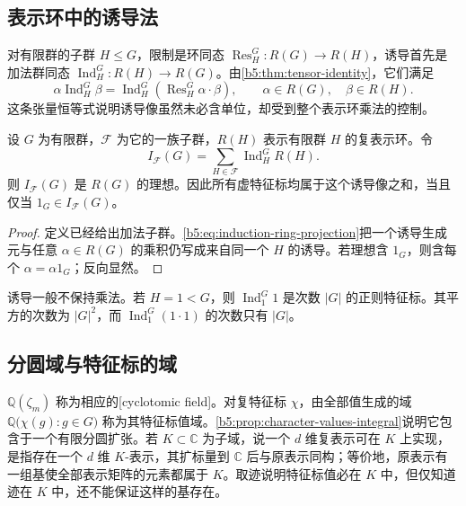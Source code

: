 \subsection{表示环中的诱导法}
\label{b5:subsec:0501:03}

对有限群的子群 \(H\le G\)，限制是环同态 \(\operatorname{Res}_H^G:R(G)\rightarrow R(H)\)，诱导首先是加法群同态 \(\operatorname{Ind}_H^G:R(H)\rightarrow R(G)\)。由\cref{b5:thm:tensor-identity}，它们满足
\begin{equation}\label{b5:eq:induction-ring-projection}
	\alpha\operatorname{Ind}_H^G\beta =\operatorname{Ind}_H^G\left(\operatorname{Res}_H^G\alpha\cdot\beta\right), \qquad \alpha\in R(G),\quad\beta\in R(H).
\end{equation}
这条张量恒等式说明诱导像虽然未必含单位，却受到整个表示环乘法的控制。

\begin{proposition}\label{b5:prop:induction-ideal}
	设 \(G\) 为有限群，\(\mathcal F\) 为它的一族子群，\(R(H)\) 表示有限群 \(H\) 的复表示环。令
	\[
		I_{\mathcal F}(G)=\sum_{H\in\mathcal F}\operatorname{Ind}_H^G R(H).
	\]
	则 \(I_{\mathcal F}(G)\) 是 \(R(G)\) 的理想。因此所有虚特征标均属于这个诱导像之和，当且仅当 \(1_G\in I_{\mathcal F}(G)\)。
\end{proposition}
\begin{proof}
	定义已经给出加法子群。\eqref{b5:eq:induction-ring-projection}把一个诱导生成元与任意 \(\alpha\in R(G)\) 的乘积仍写成来自同一个 \(H\) 的诱导。若理想含 \(1_G\)，则含每个 \(\alpha=\alpha1_G\)；反向显然。
\end{proof}

诱导一般不保持乘法。若 \(H=1<G\)，则 \(\operatorname{Ind}_1^G1\) 是次数 \(|G|\) 的正则特征标。其平方的次数为 \(|G|^2\)，而 \(\operatorname{Ind}_1^G(1\cdot1)\) 的次数只有 \(|G|\)。

\subsection{分圆域与特征标的域}
\label{b5:subsec:0501:04}

\(\mathbb Q(\zeta_m)\) 称为相应的[cyclotomic field]。对复特征标 \(\chi\)，由全部值生成的域 \(\mathbb Q\bigl(\chi(g):g\in G\bigr)\) 称为其特征标值域。\cref{b5:prop:character-values-integral}说明它包含于一个有限分圆扩张。若 \(K\subset\mathbb C\) 为子域，说一个 \(d\) 维复表示可在 \(K\) 上实现，是指存在一个 \(d\) 维 \(K\)-表示，其扩标量到 \(\mathbb C\) 后与原表示同构；等价地，原表示有一组基使全部表示矩阵的元素都属于 \(K\)。取迹说明特征标值必在 \(K\) 中，但仅知道迹在 \(K\) 中，还不能保证这样的基存在。

